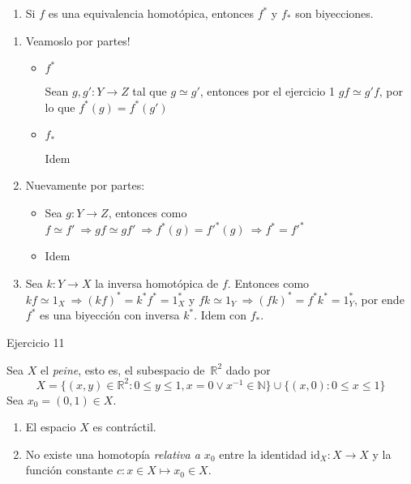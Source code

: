 \documentclass[11pt]{article}
\newcommand{\R}{{\mathbb{R}}}
\newcommand{\N}{{\mathbb{N}}}
\newenvironment{proof}[1][Demostraci\'on]{\begin{trivlist}
\item[\hskip \labelsep {\bfseries #1}]}{\end{trivlist}}
\newcommand{\qed}{\nobreak \ifvmode \relax \else
      \ifdim\lastskip<1.5em \hskip-\lastskip
      \hskip1.5em plus0em minus0.5em \fi \nobreak
      \vrule height0.75em width0.5em depth0.25em\fi}
\def \be{\begin{enumerate}}
\def \en{\end{enumerate}}
\begin{document}
\begin{enumerate}
\item Si $f$ es una equivalencia homot\'opica, entonces $f^*$ y $f_*$ son
biyecciones.
\en

\begin{proof}

\begin{enumerate}

\item Veamoslo por partes!

\begin{itemize}
\item {$f^*$}

Sean $g,g':Y \rightarrow Z$ tal que $g \simeq g'$, entonces por el ejercicio 1 $gf \simeq g'f$, por lo que $f^*(g) = f^*(g') $

\item {$f_*$}

Idem

\end{itemize}

\item Nuevamente por partes:

\begin{itemize}
\item Sea $g:Y \rightarrow Z$, entonces como $f \simeq f' \ \Longrightarrow gf \simeq gf' \ \Longrightarrow f^*(g) = f'^*(g) \ \Longrightarrow f^* = f'^*$
\item Idem
\end{itemize}

\item Sea $k:Y \rightarrow X$ la inversa homot\'opica de $f$. Entonces como $kf \simeq 1_X \ \Longrightarrow (kf)^*=k^*f^* = 1_{X}^*$ y $fk \simeq 1_Y \ \Longrightarrow (fk)^* = f^*k^* = 1_{Y}^*$, por ende $f^*$ es una biyecci\'on con inversa $k^*$. Idem con $f_*$. \qed

\end{enumerate}

\end{proof}

\item {Ejercicio 11}

Sea $X$ el \textit{peine}, esto es, el subespacio de~$\R^2$ dado por
  \[
  X=\{(x,y)\in\R^2:0\leq y\leq1, x=0\vee x^{-1}\in\N\} \cup \{(x,0):0\leq x\leq 1\}
  \]
Sea $x_0=(0,1)\in X$.
\be

\item El espacio $X$ es contr\'actil.

\item No existe una homotop\'ia \textit{relativa a $x_0$} entre la identidad
$\mathrm{id}_X:X\to X$ y la funci\'on constante $c:x\in X\mapsto x_0\in X$.



\end{enumerate}
\end{document}
